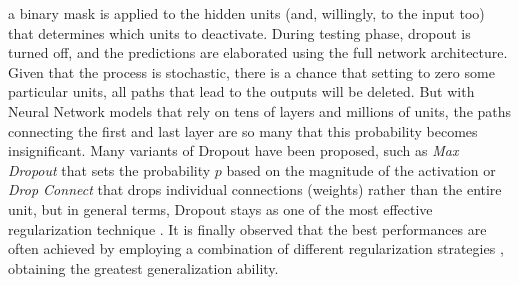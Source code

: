 \documentclass[binding=0.7cm, oneside]{sapthesis}
\begin{document}
a binary mask is applied to the hidden units (and, willingly, to the input too) that determines which units to deactivate. During testing phase, dropout is turned off, and the predictions are elaborated using
the full network architecture. Given that the process is stochastic, there is a chance that setting to zero some particular units, all paths that lead to the outputs will be deleted. But with Neural Network models that rely on
tens of layers and millions of units, the paths connecting the first and last layer are so many that this probability becomes insignificant. Many variants of Dropout have been proposed, such as \emph{Max Dropout} that sets the
probability $p$ based on the magnitude of the activation or \emph{Drop Connect} that drops individual connections (weights) rather than the entire unit, but in general terms, Dropout stays as one of the most effective regularization
technique \cite{regular_comparison}. It is finally observed that the best performances are often achieved by employing a combination of different regularization strategies \cite{regular_combining,survey_regular}, obtaining the greatest generalization ability.
\end{document}
